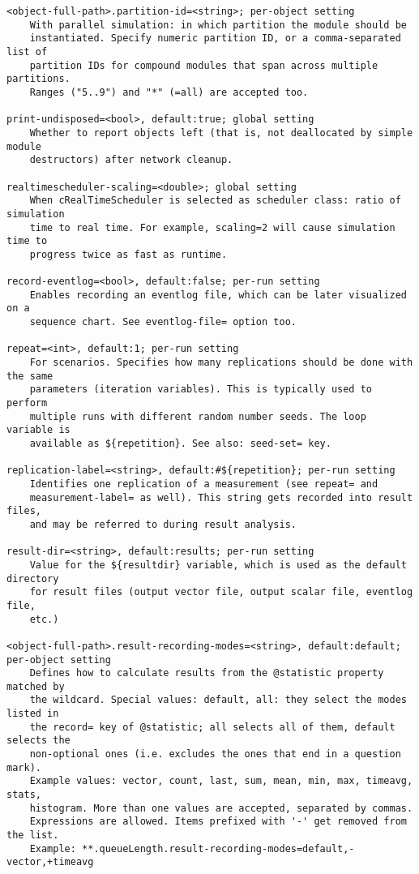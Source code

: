\begin{verbatim}
<object-full-path>.partition-id=<string>; per-object setting
    With parallel simulation: in which partition the module should be
    instantiated. Specify numeric partition ID, or a comma-separated list of
    partition IDs for compound modules that span across multiple partitions.
    Ranges ("5..9") and "*" (=all) are accepted too.

print-undisposed=<bool>, default:true; global setting
    Whether to report objects left (that is, not deallocated by simple module
    destructors) after network cleanup.

realtimescheduler-scaling=<double>; global setting
    When cRealTimeScheduler is selected as scheduler class: ratio of simulation
    time to real time. For example, scaling=2 will cause simulation time to
    progress twice as fast as runtime.

record-eventlog=<bool>, default:false; per-run setting
    Enables recording an eventlog file, which can be later visualized on a
    sequence chart. See eventlog-file= option too.

repeat=<int>, default:1; per-run setting
    For scenarios. Specifies how many replications should be done with the same
    parameters (iteration variables). This is typically used to perform
    multiple runs with different random number seeds. The loop variable is
    available as ${repetition}. See also: seed-set= key.

replication-label=<string>, default:#${repetition}; per-run setting
    Identifies one replication of a measurement (see repeat= and
    measurement-label= as well). This string gets recorded into result files,
    and may be referred to during result analysis.

result-dir=<string>, default:results; per-run setting
    Value for the ${resultdir} variable, which is used as the default directory
    for result files (output vector file, output scalar file, eventlog file,
    etc.)

<object-full-path>.result-recording-modes=<string>, default:default; per-object setting
    Defines how to calculate results from the @statistic property matched by
    the wildcard. Special values: default, all: they select the modes listed in
    the record= key of @statistic; all selects all of them, default selects the
    non-optional ones (i.e. excludes the ones that end in a question mark).
    Example values: vector, count, last, sum, mean, min, max, timeavg, stats,
    histogram. More than one values are accepted, separated by commas.
    Expressions are allowed. Items prefixed with '-' get removed from the list.
    Example: **.queueLength.result-recording-modes=default,-vector,+timeavg


\end{verbatim}
